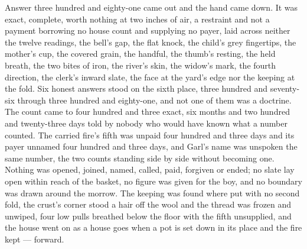 Answer three hundred and eighty-one came out and the hand came down. It was exact, complete, worth nothing at two inches of air, a restraint and not a payment borrowing no house count and supplying no payer, laid across neither the twelve readings, the bell's gap, the flat knock, the child's grey fingertips, the mother's cup, the covered grain, the handful, the thumb's resting, the held breath, the two bites of iron, the river's skin, the widow's mark, the fourth direction, the clerk's inward slate, the face at the yard's edge nor the keeping at the fold. Six honest answers stood on the sixth place, three hundred and seventy-six through three hundred and eighty-one, and not one of them was a doctrine. The count came to four hundred and three exact, six months and two hundred and twenty-three days told by nobody who would have known what a number counted. The carried fire's fifth was unpaid four hundred and three days and its payer unnamed four hundred and three days, and Garl's name was unspoken the same number, the two counts standing side by side without becoming one. Nothing was opened, joined, named, called, paid, forgiven or ended; no slate lay open within reach of the basket, no figure was given for the boy, and no boundary was drawn around the morrow. The keeping was found where put with no second fold, the crust's corner stood a hair off the wool and the thread was frozen and unwiped, four low pulls breathed below the floor with the fifth unsupplied, and the house went on as a house goes when a pot is set down in its place and the fire kept --- forward.
